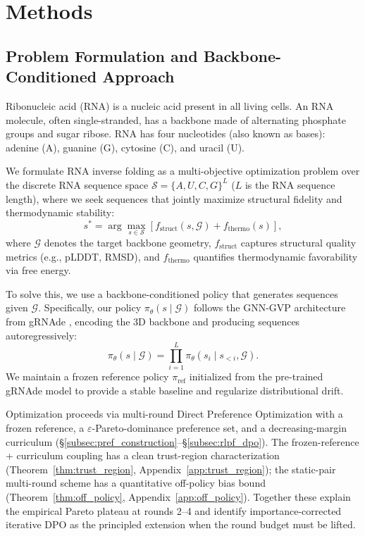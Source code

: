 \section{Methods}
\label{sec:method}

\subsection{Problem Formulation and Backbone-Conditioned Approach}
Ribonucleic acid (RNA) is a nucleic acid present in all living cells. An RNA molecule, often single-stranded, has a backbone made of alternating phosphate groups and sugar ribose. RNA has four nucleotides (also known as bases): adenine (A), guanine (G), cytosine (C), and uracil (U).

We formulate RNA inverse folding as a multi-objective optimization problem over the discrete RNA sequence space $\mathcal{S}=\{A,U,C,G\}^L$ ($L$ is the RNA sequence length), where we seek sequences that jointly maximize structural fidelity and thermodynamic stability:
\begin{equation}
s^*=\arg\max_{s\in\mathcal{S}}\left[f_{\text{struct}}(s,\mathcal{G})+f_{\text{thermo}}(s)\right],
\end{equation}
where $\mathcal{G}$ denotes the target backbone geometry, $f_{\text{struct}}$ captures structural quality metrics (e.g., pLDDT, RMSD), and $f_{\text{thermo}}$ quantifies thermodynamic favorability via free energy.

To solve this, we use a backbone-conditioned policy that generates sequences given $\mathcal{G}$. Specifically, our policy $\pi_\theta(s\mid\mathcal{G})$ follows the GNN-GVP architecture from gRNAde \citep{joshi2025grnade}, encoding the 3D backbone and producing sequences autoregressively:
\begin{equation}
\pi_\theta(s\mid\mathcal{G})=\prod_{i=1}^L \pi_\theta(s_i \mid s_{<i}, \mathcal{G}).
\end{equation}
We maintain a frozen reference policy $\pi_{\mathrm{ref}}$ initialized from the pre-trained gRNAde model to provide a stable baseline and regularize distributional drift.

Optimization proceeds via multi-round Direct Preference Optimization with a frozen reference, a $\varepsilon$-Pareto-dominance preference set, and a decreasing-margin curriculum (\S\ref{subsec:pref_construction}--\S\ref{subsec:rlpf_dpo}). The frozen-reference + curriculum coupling has a clean trust-region characterization (Theorem~\ref{thm:trust_region}, Appendix~\ref{app:trust_region}); the static-pair multi-round scheme has a quantitative off-policy bias bound (Theorem~\ref{thm:off_policy}, Appendix~\ref{app:off_policy}). Together these explain the empirical Pareto plateau at rounds 2--4 and identify importance-corrected iterative DPO as the principled extension when the round budget must be lifted.


